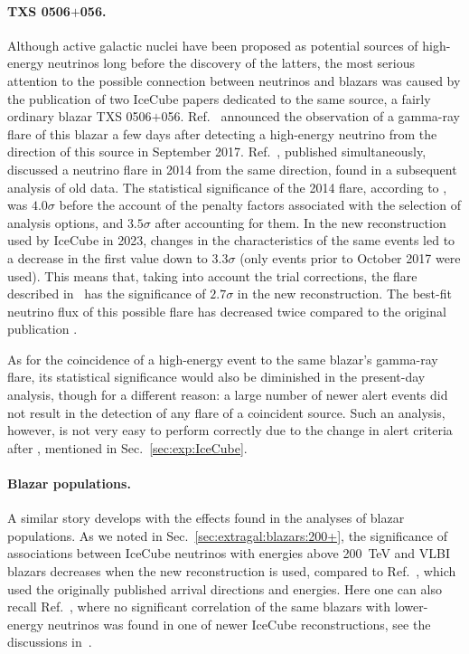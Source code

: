 \documentclass[a4paper,noshowpacs,noshowkeys,floatfix,twocolumn,preprintnumbers,nofootinbib]{revtex4-2}
\begin{document}
\paragraph{TXS 0506$+$056.}
Although active galactic nuclei have been proposed as potential sources of high-energy neutrinos long before the discovery of the latters, the most serious attention to the possible connection between neutrinos and blazars was caused by the publication of two IceCube papers \cite{IceCube-TXS0506gamma,IceCube-TXS0506-flare} dedicated to the same source, a fairly ordinary blazar TXS 0506$+$056. Ref.~\cite{IceCube-TXS0506gamma} announced the observation of a gamma-ray flare of this blazar a few days after detecting a high-energy neutrino from the direction of this
source in September 2017. Ref.~\cite{IceCube-TXS0506-flare}, published simultaneously, discussed a neutrino flare in 2014 from the same direction, found in a subsequent analysis of old data. The statistical significance of the 2014 flare, according to \cite{IceCube-TXS0506-flare}, was $4.0\sigma$ before the account of the penalty factors associated with the selection of analysis options, and $3.5\sigma$ after accounting for them. In the new reconstruction used by IceCube in 2023, changes in the characteristics of the same events led to a decrease in the first value down to $3.3\sigma$ \cite{IceCube-TXS0506-ICRC2023} (only events prior to October 2017 were used). This means that, taking into account the trial corrections, the flare described in~\cite{IceCube-TXS0506-flare} has the significance of $2.7\sigma$ in the new reconstruction. The best-fit neutrino flux of this possible flare has decreased twice \cite{IceCube-TXS0506-ICRC2023} compared to the original publication \cite{IceCube-TXS0506-flare}.

As for the coincidence of a high-energy event to the same blazar's gamma-ray flare, its statistical significance would also be diminished in the present-day analysis, though for a different reason: a large number of newer alert events did not result in the detection of any flare of a coincident source. Such an analysis, however, is not very easy to perform correctly due to the change in alert criteria after \cite{IceCube-TXS0506gamma}, mentioned in Sec.~\ref{sec:exp:IceCube}.


\paragraph{Blazar populations.}
A similar story develops with the effects found in the analyses of blazar populations. As we noted in Sec.~\ref{sec:extragal:blazars:200+}, the significance of associations between IceCube neutrinos with energies above 200~TeV and VLBI blazars decreases \cite{IceCube:corr-IceCat} when the new reconstruction \cite{IceCat} is used, compared to Ref.~\cite{neutradio1}, which used the originally published arrival directions and energies. Here one can also recall Ref.~\cite{Zhou}, where no significant correlation of the same blazars with lower-energy neutrinos was found in one of newer IceCube reconstructions, see the discussions in~\cite{PlavinICRC2021, ST-UFN}.
\end{document}
